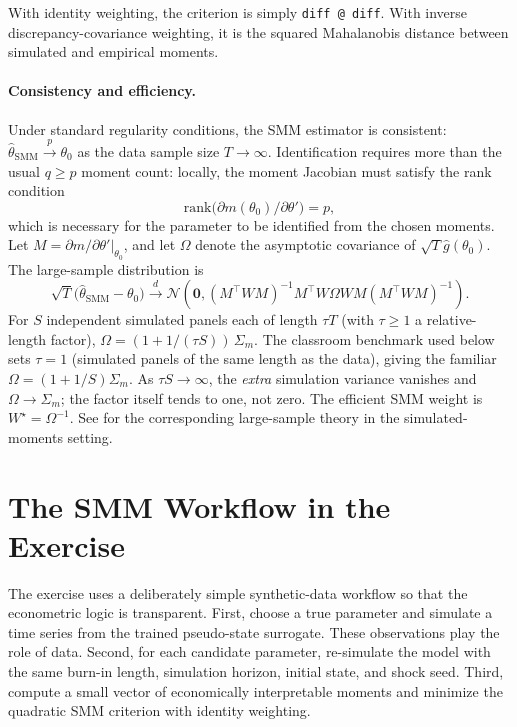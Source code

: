 \documentclass[11pt,a4paper]{report}
\begin{document}
\noindent With identity weighting, the criterion is simply \texttt{diff @ diff}.  With inverse discrepancy-covariance weighting, it is the squared Mahalanobis distance between simulated and empirical moments.

\paragraph{Consistency and efficiency.}  Under standard regularity conditions, the SMM estimator is consistent: $\hat{\theta}_\mathrm{SMM} \xrightarrow{p} \theta_0$ as the data sample size $T \to \infty$.  Identification requires more than the usual $q \geq p$ moment count: locally, the moment Jacobian must satisfy the rank condition
\begin{equation}
\mathrm{rank}\bigl(\partial m(\theta_0)/\partial \theta'\bigr) = p,
\end{equation}
which is necessary for the parameter to be identified from the chosen moments.  Let $M=\partial m/\partial\theta'|_{\theta_0}$, and let $\Omega$ denote the asymptotic covariance of $\sqrt{T}\hat g(\theta_0)$.  The large-sample distribution is
\begin{equation}
\sqrt{T}\bigl(\hat{\theta}_\mathrm{SMM}-\theta_0\bigr)
\xrightarrow{d}
\mathcal{N}\!\left(
\bm{0},
(M^\top W M)^{-1}M^\top W\Omega W M(M^\top W M)^{-1}
\right).
\end{equation}
For $S$ independent simulated panels each of length $\tau T$ (with $\tau \geq 1$ a relative-length factor), $\Omega = (1 + 1/(\tau S))\,\Sigma_m$.  The classroom benchmark used below sets $\tau = 1$ (simulated panels of the same length as the data), giving the familiar $\Omega = (1+1/S)\Sigma_m$.  As $\tau S \to \infty$, the \emph{extra} simulation variance vanishes and $\Omega \to \Sigma_m$; the factor itself tends to one, not zero.  The efficient SMM weight is $W^\star = \Omega^{-1}$.  See \citet{duffie1993simulated} for the corresponding large-sample theory in the simulated-moments setting.

\section{The SMM Workflow in the Exercise}

The exercise uses a deliberately simple synthetic-data workflow so that the econometric logic is transparent.  First, choose a true parameter and simulate a time series from the trained pseudo-state surrogate.  These observations play the role of data.  Second, for each candidate parameter, re-simulate the model with the same burn-in length, simulation horizon, initial state, and shock seed.  Third, compute a small vector of economically interpretable moments and minimize the quadratic SMM criterion with identity weighting.
\end{document}
